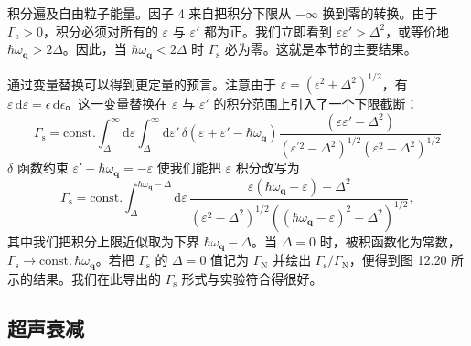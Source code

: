 积分遍及自由粒子能量。因子 4 来自把积分下限从 $-\infty$ 换到零的转换。由于 $\Gamma_{\mathrm{s}}>0$，积分必须对所有的 $\varepsilon$ 与 $\varepsilon'$ 都为正。我们立即看到 $\varepsilon\varepsilon'>\Delta^{2}$，或等价地 $\hbar\omega_{\mathbf{q}}>2\Delta$。因此，当 $\hbar\omega_{\mathbf{q}}<2\Delta$ 时 $\Gamma_{\mathrm{s}}$ 必为零。这就是本节的主要结果。

通过变量替换可以得到更定量的预言。注意由于 $\varepsilon=(\epsilon^{2}+\Delta^{2})^{1/2}$，有 $\varepsilon\,\mathrm{d}\varepsilon=\epsilon\,\mathrm{d}\epsilon$。这一变量替换在 $\varepsilon$ 与 $\varepsilon'$ 的积分范围上引入了一个下限截断：
\begin{equation*}
\Gamma_{\mathrm{s}}=\mathrm{const.}\int_{\Delta}^{\infty}\mathrm{d}\varepsilon\int_{\Delta}^{\infty}\mathrm{d}\varepsilon'\,\delta\left(\varepsilon+\varepsilon'-\hbar\omega_{\mathbf{q}}\right)\frac{\left(\varepsilon\varepsilon'-\Delta^{2}\right)}{\left(\varepsilon^{\prime 2}-\Delta^{2}\right)^{1/2}\left(\varepsilon^{2}-\Delta^{2}\right)^{1/2}}\tag{12.279}
\end{equation*}
$\delta$ 函数约束 $\varepsilon'-\hbar\omega_{\mathbf{q}}=-\varepsilon$ 使我们能把 $\varepsilon$ 积分改写为
\begin{equation*}
\Gamma_{\mathrm{s}}=\mathrm{const.}\int_{\Delta}^{\hbar\omega_{\mathbf{q}}-\Delta}\mathrm{d}\varepsilon\,\frac{\varepsilon\left(\hbar\omega_{\mathbf{q}}-\varepsilon\right)-\Delta^{2}}{\left(\varepsilon^{2}-\Delta^{2}\right)^{1/2}\left(\left(\hbar\omega_{\mathbf{q}}-\varepsilon\right)^{2}-\Delta^{2}\right)^{1/2}},\tag{12.280}
\end{equation*}
其中我们把积分上限近似取为下界 $\hbar\omega_{\mathbf{q}}-\Delta$。当 $\Delta=0$ 时，被积函数化为常数，$\Gamma_{\mathrm{s}}\to\mathrm{const.}\,\hbar\omega_{\mathbf{q}}$。若把 $\Gamma_{\mathrm{s}}$ 的 $\Delta=0$ 值记为 $\Gamma_{\mathrm{N}}$ 并绘出 $\Gamma_{\mathrm{s}}/\Gamma_{\mathrm{N}}$，便得到图 12.20 所示的结果。我们在此导出的 $\Gamma_{\mathrm{s}}$ 形式与实验符合得很好。

\subsection{超声衰减}

